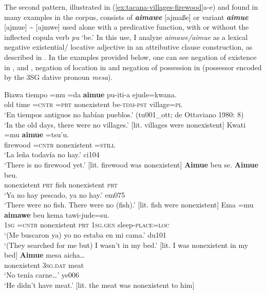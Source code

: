 \documentclass[output=paper]{langsci/langscibook}
\begin{document}
The second pattern, illustrated in (\ref{ex:tacana-villages-firewood}a-e)
and found in many examples in the corpus, consists of
\textbf{\textit{aimawe}} [ajmaße]  or variant \textbf{\textit{aimue}}
[ajmue] {\textasciitilde} [ajmwe] used alone with a predicative function,
with or without the inflected copula verb \textit{pu} `be.' In this use, I
analyze \textit{aimawe\slash aimue} as a lexical negative existential\slash
locative adjective in an attributive clause construction, as described in
. In the examples provided below, one can see
negation of existence in ,  and , negation of location in
 and negation of possession in  (possessor encoded by the 3SG dative pronoun \textit{mesa}).

\begin{exe}\ex\label{ex:tacana-villages-firewood}\begin{xlist}
\ex\label{ex:tacana-villages}
\gll {\ob}Biawa tiempo{\cb} =mu =da \textbf{aimue}
pu-iti-a ejude=kwana.\\
    old  time  =\textsc{cntr}  \textsc{=prt}  nonexistent
    be-\textsc{tdm-pst}  village=\textsc{pl}\\
\glt `En tiempos antiguos no habían pueblos.' (tu001\_ott; de Ottaviano 1980: 8)\\
`In the old days, there were no villages.' [lit. villages were nonexistent]
\ex\label{ex:tacana-firewood}
\gll {}Kwati  =mu \textbf{aimue}  =tsu'u.\\
    firewood  =\textsc{cntr}  nonexistent  =\textsc{still}\\
\glt `La leña todavía no hay.' ci104\\
`There is no firewood yet.' [lit. firewood was nonexistent]
\ex\label{ex:tacana-nofish}
\gll {}\textbf{Aimue}  beu se. \textbf{Aimue}  beu.\\
    nonexistent  \textsc{prt}  fish  nonexistent  \textsc{prt}\\
\glt `Ya no hay pescado, ya no hay.' em075\\
`There were no fish. There were no (fish).' [lit. fish were nonexistent]
\ex\label{ex:tacana-mybed}
\gll {}Ema  =mu \textbf{aimawe}  beu
 kema tawi-jude=su{\cb}.\\
    \textsc{1sg}  \textsc{=cntr}  nonexistent  \textsc{prt}
    \textsc{1sg.gen}  sleep-\textsc{place=loc}\\
\glt `(Me buscaron ya) yo no estaba en mi cama.' du101\\
`(They searched for me but) I wasn't in my bed.' [lit. I was nonexistent in my bed]
\ex\label{ex:tacana-no-meat}
\gll {}\textbf{Aimue} mesa aicha…\\
    nonexistent  \textsc{3sg.dat}  meat\\
\glt `No tenía carne…' ye006\\
`He didn't have meat.' [lit. the meat was nonexistent to him]
\end{xlist}\end{exe}
\end{document}
